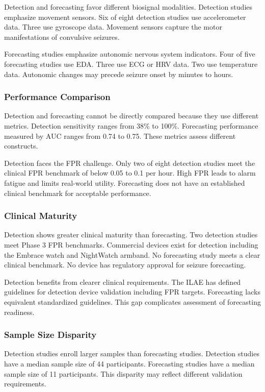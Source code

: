 Detection and forecasting favor different biosignal modalities. Detection studies emphasize movement sensors. Six of eight detection studies use accelerometer data. Three use gyroscope data. Movement sensors capture the motor manifestations of convulsive seizures.

Forecasting studies emphasize autonomic nervous system indicators. Four of five forecasting studies use EDA. Three use ECG or HRV data. Two use temperature data. Autonomic changes may precede seizure onset by minutes to hours.

\subsubsection{Performance Comparison}

Detection and forecasting cannot be directly compared because they use different metrics. Detection sensitivity ranges from 38\% to 100\%. Forecasting performance measured by AUC ranges from 0.74 to 0.75. These metrics assess different constructs.

Detection faces the FPR challenge. Only two of eight detection studies meet the clinical FPR benchmark of below 0.05 to 0.1 per hour. High FPR leads to alarm fatigue and limits real-world utility. Forecasting does not have an established clinical benchmark for acceptable performance.

\subsubsection{Clinical Maturity}

Detection shows greater clinical maturity than forecasting. Two detection studies meet Phase 3 FPR benchmarks. Commercial devices exist for detection including the Embrace watch and NightWatch armband. No forecasting study meets a clear clinical benchmark. No device has regulatory approval for seizure forecasting.

Detection benefits from clearer clinical requirements. The ILAE has defined guidelines for detection device validation including FPR targets. Forecasting lacks equivalent standardized guidelines. This gap complicates assessment of forecasting readiness.

\subsubsection{Sample Size Disparity}

Detection studies enroll larger samples than forecasting studies. Detection studies have a median sample size of 44 participants. Forecasting studies have a median sample size of 11 participants. This disparity may reflect different validation requirements.

